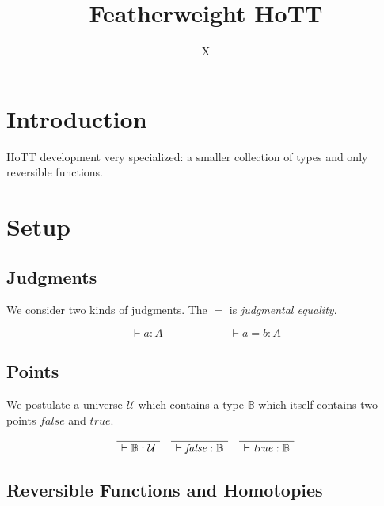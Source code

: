 \documentclass[format=acmlarge,review,natbib]{acmart}
\newcommand{\fc}{\mathit{false}}
\newcommand{\tc}{\mathit{true}}
\newcommand{\boolt}{\mathbb{B}}
\newcommand{\univ}{\mathcal{U}}
\newcommand{\proves}{\vdash}
\newcommand{\jdg}[2]{\proves #1 : #2}
\newcommand{\jdge}[3]{\proves #1 = #2 : #3}
\begin{document}
\title{Featherweight HoTT}

\author{X}

\begin{abstract}
\end{abstract}

\maketitle

\section{Introduction}

HoTT development very specialized: a smaller collection of types and only
reversible functions.

\section{Setup}

\subsection{Judgments}

We consider two kinds of judgments. The $=$ is \emph{judgmental equality}.

\[
\jdg{a}{A} \qquad\qquad\qquad \jdge{a}{b}{A}
\]

\subsection{Points}

We postulate a universe $\univ$ which contains a type $\boolt$ which itself contains
two points $\fc$ and $\tc$.

\[\begin{array}{c}
  \AxiomC{}
  \UnaryInfC{$\jdg{\boolt}{\univ}$}
  \DisplayProof
\quad
  \AxiomC{}
  \UnaryInfC{$\jdg{\fc}{\boolt}$}
  \DisplayProof
\quad
  \AxiomC{}
  \UnaryInfC{$\jdg{\tc}{\boolt}$}
  \DisplayProof
\end{array}\]

\subsection{Reversible Functions and Homotopies}
\end{document}
